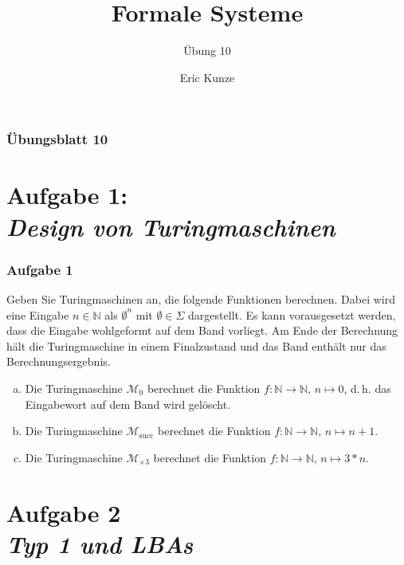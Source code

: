 \documentclass{beamer}
\begin{document}
	
	\title{Formale Systeme}
	\subtitle{Übung 10}
	\author{Eric Kunze}
	\date{}

	\maketitle


	\begin{frame} \frametitle{Übungsblatt 10}
		\tableofcontents
	\end{frame}

	\section{Aufgabe 1: \\ \itshape Design von Turingmaschinen}

	

	\begin{frame} \frametitle{Aufgabe 1}
		\small		
		Geben Sie Turingmaschinen an, die folgende Funktionen 
		berechnen. Dabei wird eine Eingabe $n \in \mathbb N$ als $\emptyset^n$ mit $\emptyset \in \Sigma$ dargestellt. Es kann vorausgesetzt werden, dass die Eingabe wohlgeformt auf dem Band vorliegt. Am Ende der Berechnung hält die Turingmaschine in einem Finalzustand und das Band enthält nur das Berechnungsergebnis. 
		
		\begin{enumerate}[(a)]
			\item Die Turingmaschine $\mathcal M_{0}$ berechnet die
			Funktion $f: \mathbb N \rightarrow \mathbb N,\,n\mapsto 0$, d.\,h. das Eingabewort auf dem
			Band wird gelöscht.
			\item Die Turingmaschine $\mathcal M_{\operatorname{succ}}$ berechnet die
			Funktion $f:\mathbb N\rightarrow \mathbb N,\,n\mapsto n+1$.
			\item Die Turingmaschine $\mathcal M_{\times 3}$ berechnet die
			Funktion $f:\mathbb N \rightarrow \mathbb N,\,n\mapsto 3*n$.
		\end{enumerate} 
	\end{frame}

	

	\section{Aufgabe 2 \\ \itshape Typ 1 und LBAs}
	
\end{document}
